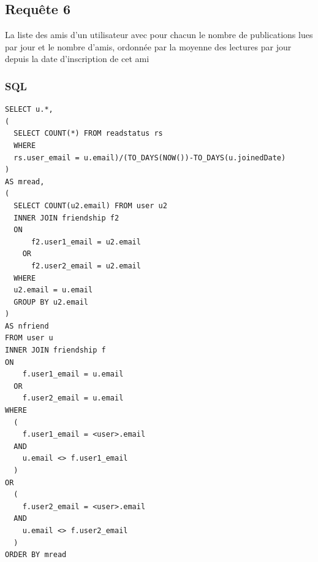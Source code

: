 \documentclass[a4paper,10pt]{article}
\begin{document}
\subsection{Requête 6}
La liste des amis d’un utilisateur avec pour chacun le nombre de publications lues par jour et le nombre
d’amis, ordonnée par la moyenne des lectures par jour depuis la date d’inscription de cet ami

\subsubsection{SQL}
\begin{lstlisting}
SELECT u.*,
(
  SELECT COUNT(*) FROM readstatus rs 
  WHERE 
  rs.user_email = u.email)/(TO_DAYS(NOW())-TO_DAYS(u.joinedDate)
) 
AS mread,
(
  SELECT COUNT(u2.email) FROM user u2
  INNER JOIN friendship f2 
  ON 
      f2.user1_email = u2.email 
    OR 
      f2.user2_email = u2.email
  WHERE 
  u2.email = u.email 
  GROUP BY u2.email
) 
AS nfriend
FROM user u
INNER JOIN friendship f 
ON 
    f.user1_email = u.email 
  OR 
    f.user2_email = u.email
WHERE 
  (
    f.user1_email = <user>.email 
  AND 
    u.email <> f.user1_email
  ) 
OR 
  (
    f.user2_email = <user>.email 
  AND 
    u.email <> f.user2_email
  )
ORDER BY mread
\end{lstlisting}
		
\end{document}
